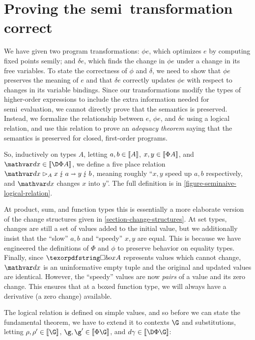 \section{Proving the semi\naive\ transformation correct}


\label{section-seminaive-logical-relation}

We have given two program transformations: $\phi e$, which optimizes $e$ by
computing fixed points semi\naive{}ly; and $\delta e$, which finds the change in
$\phi e$ under a change in its free variables.
%
To state the correctness of $\phi$ and $\delta$, we need to show that $\phi e$
preserves the meaning of $e$ and that $\delta e$ correctly updates $\phi e$ with
respect to changes in its variable bindings.
%
Since our transformations modify the types of higher-order expressions to
include the extra information needed for semi\naive\ evaluation, we cannot
directly prove that the semantics is preserved.
%
Instead, we formalize the relationship between $e$, $\phi e$, and $\delta e$
using a logical relation, and use this relation to prove an \emph{adequacy
  theorem} saying that the semantics is preserved for closed, first-order
programs.



So, inductively on types $A$, letting $a,b \in \llbracket{A}\rrbracket$, $x,y \in \llbracket{\Phi A}\rrbracket$,
and $\dx \in \den{\DP A}$, we define a five place relation
$\weirdat{A}{\dx}{x}{a}{y}{b}$, meaning roughly ``$x,y$ speed up $a,b$
respectively, and $\dx$ changes $x$ into $y$''. The full definition is in
\cref{figure-seminaive-logical-relation}.

At product, sum, and function types this is essentially a more elaborate version
of the change structures given in \cref{section-change-structures}.
%
At set types, changes are still a set of values added to the initial value, but
we additionally insist that the ``slow'' $a,b$ and ``speedy'' $x,y$ are equal.
%
This is because we have engineered the definitions of $\Phi$ and $\phi$ to
preserve behavior on equality types.
%
Finally, since $\iso A$ represents values which cannot change, $\dx$ is an
uninformative empty tuple and the original and updated values are identical.
%
However, the ``speedy'' values are now \emph{pairs} of a value and its zero
change.
%
This ensures that at a boxed function type, we will always have a derivative (a
zero change) available.

The logical relation is defined on simple values, and so before we can state the
fundamental theorem, we have to extend it to contexts $\G$ and substitutions,
letting $\rho,\rho' \in \den{\G}$, $\g,\g' \in \den{\Phi\G}$, and $\dgamma \in
\den{\DP\G}$:


